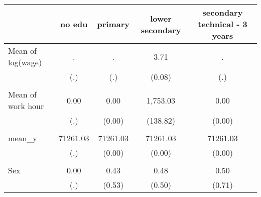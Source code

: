 \begin{tabular}{l*{4}{c}}
    \hline
                    &   no edu&  primary&lower secondary&secondary technical - 3 years\\
    \hline
    Mean of log(wage)&        .&        .&     3.71&        .\\
                    &      (.)&      (.)&   (0.08)&      (.)\\
    \\
    Mean of work hour&     0.00&     0.00& 1,753.03&     0.00\\
                    &      (.)&   (0.00)& (138.82)&   (0.00)\\
    \\
    mean\_y          & 71261.03& 71261.03& 71261.03& 71261.03\\
                    &      (.)&   (0.00)&   (0.00)&   (0.00)\\
    \\
    Sex             &     0.00&     0.43&     0.48&     0.50\\
                    &      (.)&   (0.53)&   (0.50)&   (0.71)\\
    \hline
    \end{tabular}